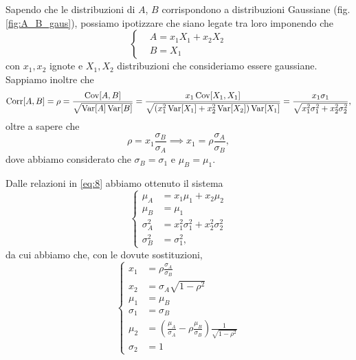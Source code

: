 \documentclass[a4paper,aps,12pt,tightenlines]{revtex4-2}
\DeclareMathOperator{\Corr}{Corr}
\DeclareMathOperator{\Cov}{Cov}
\DeclareMathOperator{\Var}{Var}
\begin{document}
Sapendo che le distribuzioni di $A$, $B$ corrispondono a distribuzioni Gaussiane (fig. \ref{fig:A_B_gaus}), possiamo ipotizzare che siano legate tra loro imponendo che \begin{equation} \left\{ 
    \begin{aligned}
        & A = x_1 X _1 + x_2 X_2\\
        & B = X_1
    \end{aligned}
\right.\label{eq:8}
\end{equation}
con $x_1, x_2$ ignote e $X_1, X_2$ distribuzioni che consideriamo essere gaussiane. Sappiamo inoltre che \begin{equation} \Corr[A,B] = \rho = \frac{\Cov[A,B]}{\sqrt{\Var[A]\Var[B]}} =  \frac{x_1\Cov[X_1, X_1]}{\sqrt{\qty(x_1^2\Var[X_1] + x_2^2\Var[X_2])\Var[X_1]}} = \frac{x_1\sigma_1}{\sqrt{x_1^2\sigma_1^2+x_2^2\sigma_2^2}},\end{equation} oltre a sapere che \begin{equation} \rho = x_1\frac{\sigma_B}{\sigma_A} \implies x_1 = \rho\frac{\sigma_A}{\sigma_B}, \end{equation} dove abbiamo considerato che $\sigma_B = \sigma_1$ e $\mu_B = \mu_1$. 

Dalle relazioni in \eqref{eq:8} abbiamo ottenuto il sistema \begin{equation}\left\{
    \begin{aligned}
        \mu_A &= x_1 \mu_1 + x_2 \mu_2\\
        \mu_B &= \mu_1\\
        \sigma_A^2 &= x_1^2\sigma_1^2 + x_2^2\sigma_2^2\\
        \sigma_B^2 &= \sigma_1^2,
    \end{aligned}
\right.
\end{equation}
da cui abbiamo che, con le dovute sostituzioni, \begin{equation}\left\{
    \begin{aligned} 
    x_1 &= \rho \frac{\sigma_A}{\sigma_B}\\
    x_2 &= \sigma_A \sqrt{1-\rho^2}\\
    \mu_1 &= \mu_B\\
    \sigma_1 &= \sigma_B\\
    \mu_2 & = \left(\frac{\mu_A}{\sigma_A} - \rho\frac{\mu_B}{\sigma_B}\right)\frac{1}{\sqrt{1-\rho^2}}\\
    \sigma_2 &= 1
    \end{aligned}
\right.
\end{equation}
\end{document}
